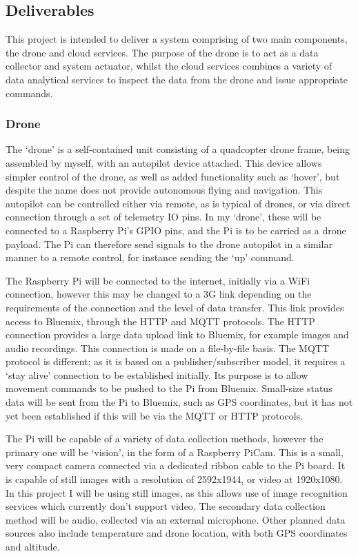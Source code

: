 \documentclass{article}
\begin{document}
\subsection{Deliverables}
This project is intended to deliver a system comprising of two main components, the drone and cloud services. The purpose of the drone is to act as a data collector and system actuator, whilst the cloud services combines a variety of data analytical services to inspect the data from the drone and issue appropriate commands.

\subsubsection{Drone}
The `drone' is a self-contained unit consisting of a quadcopter drone frame, being assembled by myself, with an autopilot device attached. This device allows simpler control of the drone, as well as added functionality such as `hover', but despite the name does not provide autonomous flying and navigation. This autopilot can be controlled either via remote, as is typical of drones, or via direct connection through a set of telemetry IO pins. In my `drone', these  will be connected to a Raspberry Pi's GPIO pins, and the Pi is to be carried as a drone payload. The Pi can therefore send signals to the drone autopilot in a similar manner to a remote control, for instance sending the `up' command.

\vspace{\baselineskip} \noindent
The Raspberry Pi will be connected to the internet, initially via a WiFi connection, however this may be changed to a 3G link depending on the requirements of the connection and the level of data transfer. This link provides access to Bluemix, through the HTTP and MQTT protocols. The HTTP connection provides a large data upload link to Bluemix, for example images and audio recordings. This connection is made on a file-by-file basis. The MQTT protocol is different; as it is based on a publisher/subscriber model, it requires a `stay alive' connection to be established initially. Its purpose is to allow movement commands to be pushed to the Pi from Bluemix. Small-size status data will be sent from the Pi to Bluemix, such as GPS coordinates, but it has not yet been established if this will be via the MQTT or HTTP protocols.

\vspace{\baselineskip} \noindent
The Pi will be capable of a variety of data collection methods, however the primary one will be `vision', in the form of a Raspberry PiCam. This is a small, very compact camera connected via a dedicated ribbon cable to the Pi board. It is capable of still images with a resolution of 2592x1944, or video at 1920x1080. In this project I will be using still images, as this allows use of image recognition services which currently don't support video. The secondary data collection method will be audio, collected via an external microphone. Other planned data sources also include temperature and drone location, with both GPS coordinates and altitude.
\end{document}
